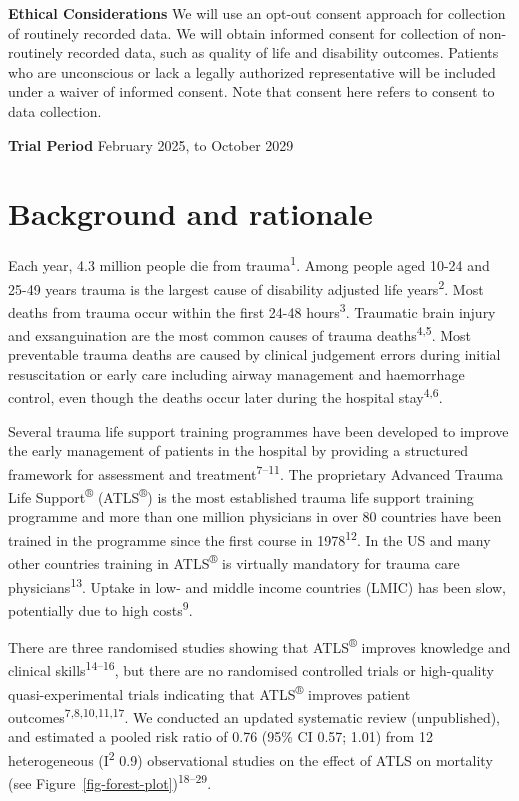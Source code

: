 \documentclass[
]{scrartcl}
\begin{document}
\textbf{Ethical Considerations} We will use an opt-out consent approach
for collection of routinely recorded data. We will obtain informed
consent for collection of non-routinely recorded data, such as quality
of life and disability outcomes. Patients who are unconscious or lack a
legally authorized representative will be included under a waiver of
informed consent. Note that consent here refers to consent to data
collection.

\textbf{Trial Period} February 2025, to October 2029

\newpage{}

\hypertarget{background-and-rationale}{%
\section{Background and rationale}\label{background-and-rationale}}

Each year, 4.3 million people die from trauma\textsuperscript{1}. Among
people aged 10-24 and 25-49 years trauma is the largest cause of
disability adjusted life years\textsuperscript{2}. Most deaths from
trauma occur within the first 24-48 hours\textsuperscript{3}. Traumatic
brain injury and exsanguination are the most common causes of trauma
deaths\textsuperscript{4,5}. Most preventable trauma deaths are caused
by clinical judgement errors during initial resuscitation or early care
including airway management and haemorrhage control, even though the
deaths occur later during the hospital stay\textsuperscript{4,6}.

Several trauma life support training programmes have been developed to
improve the early management of patients in the hospital by providing a
structured framework for assessment and
treatment\textsuperscript{7--11}. The proprietary Advanced Trauma Life
Support\textsuperscript{®} (ATLS\textsuperscript{®}) is the most
established trauma life support training programme and more than one
million physicians in over 80 countries have been trained in the
programme since the first course in 1978\textsuperscript{12}. In the US
and many other countries training in ATLS\textsuperscript{®} is
virtually mandatory for trauma care physicians\textsuperscript{13}.
Uptake in low- and middle income countries (LMIC) has been slow,
potentially due to high costs\textsuperscript{9}.

There are three randomised studies showing that ATLS\textsuperscript{®}
improves knowledge and clinical skills\textsuperscript{14--16}, but
there are no randomised controlled trials or high-quality
quasi-experimental trials indicating that ATLS\textsuperscript{®}
improves patient outcomes\textsuperscript{7,8,10,11,17}. We conducted an
updated systematic review (unpublished), and estimated a pooled risk
ratio of 0.76 (95\% CI 0.57; 1.01) from 12 heterogeneous
(I\textsuperscript{2} 0.9) observational studies on the effect of ATLS
on mortality (see Figure~\ref{fig-forest-plot})\textsuperscript{18--29}.
\end{document}
